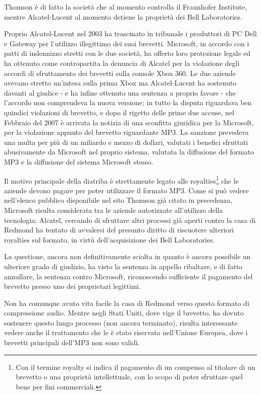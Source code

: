Thomson è di fatto la società che al momento controlla il Fraunhofer Institute, mentre Alcatel-Lucent al momento detiene la proprietà dei Bell Laboratories.

Proprio Alcatel-Lucent nel 2003 ha trascinato in tribunale i produttori di PC Dell e Gateway per l'utilizzo illegittimo dei suoi brevetti. Microsoft, in accordo con i patti di indennizzo stretti con le due società, ha offerto loro protezione legale ed ha ottenuto come contropartita la denuncia di Alcatel per la violazione degli accordi di sfruttamento dei brevetti sulla console Xbox 360. Le due aziende avevano stretto un'intesa sulla prima Xbox ma Alcatel-Lucent ha sostenuto davanti al giudice - e ha infine ottenuto una sentenza a proprio favore - che l'accordo non comprendeva la nuova versione; in tutto la disputa riguardava ben quindici violazioni di brevetto, e dopo il rigetto delle prime due accuse, nel Febbraio del 2007 è arrivata la notizia di una sconfitta giuridica per la Microsoft, per la violazione appunto del brevetto riguardante MP3. La sanzione prevedeva una multa per più di un miliardo e mezzo di dollari, valutati i benefici sfruttati abusivamente da Microsoft nel proprio sistema, valutata la diffusione del formato MP3 e la diffusione del sistema Microsoft stesso.

Il motivo principale della diatriba è strettamente legato alle royalties\footnote{Con il termine royalty si indica il pagamento di un compenso al titolare di un brevetto o una proprietà intellettuale, con lo scopo di poter sfruttare quel bene per fini commerciali.} che le aziende devono pagare per poter utilizzare il formato MP3. Come si può vedere nell'elenco pubblico disponibile nel sito Thomson già citato in precedenza, Microsoft risulta considerata tra le aziende autorizzate all'utilizzo della tecnologia; Alcatel, cercando di sfruttare altri processi già aperti contro la casa di Redmond ha tentato di avvalersi del presunto diritto di riscuotere ulteriori royalties sul formato, in virtù dell'acquisizione dei Bell Laboratories.

La questione, ancora non definitivamente sciolta in quanto è ancora possibile un ulteriore grado di giudizio, ha visto la sentenza in appello ribaltare, e di fatto annullare, la sentenza contro Microsoft, riconoscendo sufficiente il pagamento del brevetto presso uno dei proprietari legittimi.

Non ha comunque avuto vita facile la casa di Redmond verso questo formato di compressione audio. Mentre negli Stati Uniti, dove vige il brevetto, ha dovuto sostenere questo lungo processo (non ancora terminato), risulta interessante vedere anche il trattamento che le è stato riservato nell'Unione Europea, dove i brevetti principali dell'MP3 non sono validi.

